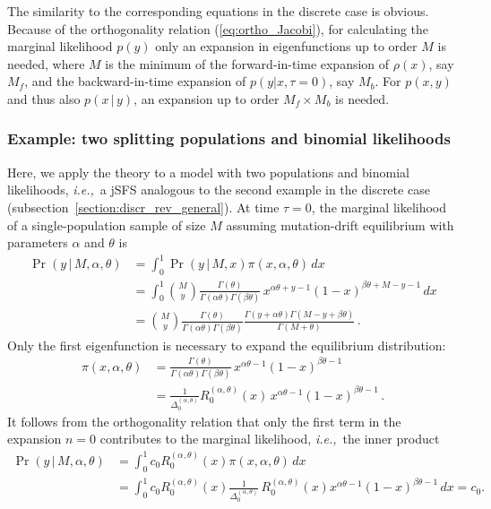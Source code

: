 \documentclass[preprint]{elsarticle}
\newcommand\given{{\,|\,}}
\newcommand\ie{{\it i.e.,}}
\begin{document}
The similarity to the corresponding equations in the discrete case is obvious. Because of the orthogonality relation (\ref{eq:ortho_Jacobi}), for calculating the marginal likelihood $p(y)$ only an expansion in eigenfunctions up to order $M$ is needed, where $M$ is the minimum of the forward-in-time expansion of $\rho(x)$, say $M_f$, and the backward-in-time expansion of $p(y|x,\tau=0)$, say $M_b$. For $p(x,y)$ and thus also $p(x\given y)$, an expansion up to order $M_f\times M_b$ is needed.


\subsubsection{Example: two splitting populations and binomial likelihoods}

Here, we apply the theory to a model with two populations and binomial likelihoods, \ie\ a jSFS analogous to the second example in the discrete case (subsection~\ref{section:discr_rev_general}). At time $\tau=0$, the marginal likelihood of a single-population sample of size $M$ assuming mutation-drift equilibrium with parameters $\alpha$ and $\theta$ is
\begin{equation}
\begin{split}
    \Pr(y\given M,\alpha,\theta)
    &=\int_0^1 \Pr(y\given M,x) \pi(x,\alpha,\theta)\,dx\\
    &=\int_0^1 \binom{M}{y}\frac{\Gamma(\theta)}{\Gamma(\alpha\theta)\Gamma(\beta\theta)}\,x^{\alpha\theta+y-1}(1-x)^{\beta\theta+M-y-1}\,dx\\
    &=\binom{M}{y}\frac{\Gamma(\theta)}{\Gamma(\alpha\theta)\Gamma(\beta\theta)}
    \frac{\Gamma(y+\alpha\theta)\Gamma(M-y+\beta\theta)}{\Gamma(M+\theta)}\,.
\end{split}
\end{equation}
Only the first eigenfunction is necessary to expand the equilibrium distribution:
\begin{equation}
\begin{split}
    \pi(x,\alpha,\theta)&=\frac{\Gamma(\theta)}{\Gamma(\alpha\theta)\Gamma(\beta\theta)}\,x^{\alpha\theta-1}(1-x)^{\beta\theta-1}\\
    &=\frac{1}{\Delta_0^{(\alpha,\theta)}}R_0^{(\alpha,\theta)}(x)\,x^{\alpha\theta-1}(1-x)^{\beta\theta-1}\,.
\end{split}
\end{equation}
It follows from the orthogonality relation that only the first term in the expansion $n=0$ contributes to the marginal likelihood, \ie\ the inner product
\begin{equation}
\begin{split}
    \Pr(y\given M,\alpha,\theta)&=\int_0^1 c_0 R_0^{(\alpha,\theta)}(x) \pi(x,\alpha,\theta)\,dx\\
    &=\int_0^1 c_0 R_0^{(\alpha,\theta)}(x) \frac{1}{\Delta_0^{(\alpha,\theta)}}\,R_0^{(\alpha,\theta)}(x) x^{\alpha\theta-1}(1-x)^{\beta\theta-1}\,dx
    =c_0.
\end{split}
\end{equation}
\end{document}
